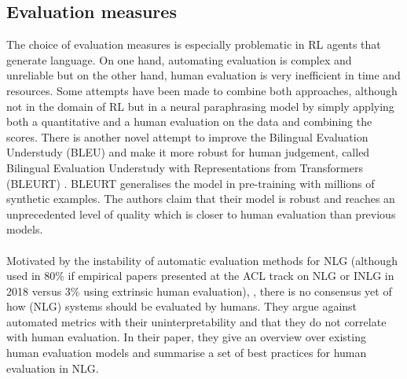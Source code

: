 \documentclass[11pt,a4paper]{article}
\begin{document}
\subsection{Evaluation measures}
The choice of evaluation measures is especially problematic in RL agents that generate language. On one hand, automating evaluation is complex and unreliable but on the other hand, human evaluation is very inefficient in time and resources. Some attempts have been made to combine both approaches, although not in the domain of RL but in a neural paraphrasing model \citep{goyal-durrett-2020-neural} by simply applying both a quantitative and a human evaluation on the data and combining the scores. There is another novel attempt to improve the Bilingual Evaluation Understudy (BLEU) and make it more robust for human judgement, called Bilingual Evaluation Understudy with Representations from Transformers (BLEURT) \citep{papineni-etal-2002-bleu,sellam2020bleurt}. BLEURT generalises the model in pre-training with millions of synthetic examples. The authors claim that their model is robust and reaches an unprecedented level of quality which is closer to human evaluation than previous models.\\\\
Motivated by the instability of automatic evaluation methods for NLG (although used in 80\% if empirical papers presented at the ACL track on NLG or INLG in 2018 versus 3\% using extrinsic human evaluation), \citet{van-der-lee-etal-2019-best}, there is no consensus yet of how (NLG) systems should be evaluated by humans. They argue against automated metrics with their uninterpretability and that they do not correlate with human evaluation. In their paper, they give an overview over existing human evaluation models and summarise a set of best practices for human evaluation in NLG.\\\\
\end{document}
